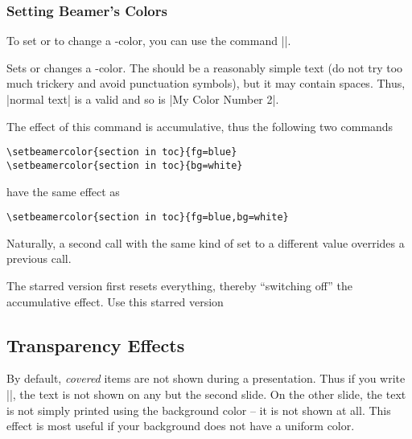 \subsubsection{Setting Beamer's Colors}

To set or to change a \beamer-color, you can use the command
|\setbeamercolor|.

\begin{command}{\setbeamercolor\opt{|*|}}
  Sets or changes a \beamer-color. The  should
  be a reasonably simple text (do not try too much trickery and avoid
  punctuation symbols), but it may contain spaces. Thus, |normal text|
  is a valid  and so is |My Color Number 2|.

  The effect of this command is accumulative, thus the following two
  commands
\begin{verbatim}
\setbeamercolor{section in toc}{fg=blue}
\setbeamercolor{section in toc}{bg=white}
\end{verbatim}
  have the same effect as 
\begin{verbatim}
\setbeamercolor{section in toc}{fg=blue,bg=white}
\end{verbatim}
  Naturally, a second call with the same kind of  set to
  a different value overrides a previous call.

  The starred version first resets everything, thereby ``switching
  off'' the accumulative effect. Use this starred version 
  
\end{command}
















\subsection{Transparency Effects}
\label{section-transparent}

By default, \emph{covered} items are not shown during a
presentation. Thus if you write ||, the text
is not shown on any but the second slide. On the other slide, the text
is not simply printed using the background color -- it is not shown at
all. This effect is most useful if your background does not have a
uniform color.

